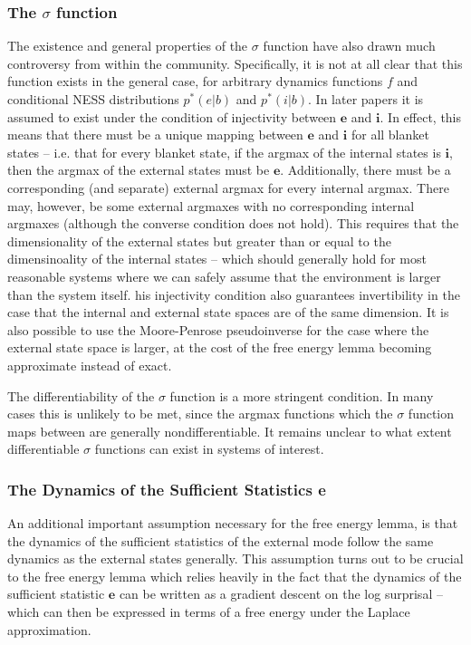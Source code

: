 \subsubsection{The $\sigma$ function}

The existence and general properties of the $\sigma$ function have also drawn much controversy from within the community. Specifically, it is not at all clear that this function exists in the general case, for arbitrary dynamics functions $f$ and conditional NESS distributions $p^*(e | b)$ and $p^*(i | b)$. In later papers it is assumed to exist under the condition of injectivity between $\boldsymbol{e}$ and $\boldsymbol{i}$. In effect, this means that there must be a unique mapping between $\boldsymbol{e}$ and $\boldsymbol{i}$ for all blanket states -- i.e. that for every blanket state, if the argmax of the internal states is $\boldsymbol{i}$, then the argmax of the external states must be $\boldsymbol{e}$. Additionally, there must be a corresponding (and separate) external argmax for every internal argmax. There may, however, be some external argmaxes with no corresponding internal argmaxes (although the converse condition does not hold). This requires that the dimensionality of the external states but greater than or equal to the dimensinoality of the internal states -- which should generally hold for most reasonable systems where we can safely assume that the environment is larger than the system itself. his injectivity condition also guarantees invertibility in the case that the internal and external state spaces are of the same dimension. It is also possible to use the Moore-Penrose pseudoinverse for the case where the external state space is larger, at the cost of the free energy lemma becoming approximate instead of exact.

The differentiability of the $\sigma$ function is a more stringent condition. In many cases this is unlikely to be met, since the argmax functions which the $\sigma$ function maps between are generally nondifferentiable. It remains unclear to what extent differentiable $\sigma$ functions can exist in systems of interest.
\subsubsection{The Dynamics of the Sufficient Statistics e}

An additional important assumption necessary for the free energy lemma, is that the dynamics of the sufficient statistics of the external mode follow the same dynamics as the external states generally.  This assumption turns out to be crucial to the free energy lemma which relies heavily in the fact that the dynamics of the sufficient statistic $\boldsymbol{e}$ can be written as a gradient descent on the log surprisal -- which can then be expressed in terms of a free energy under the Laplace approximation.

